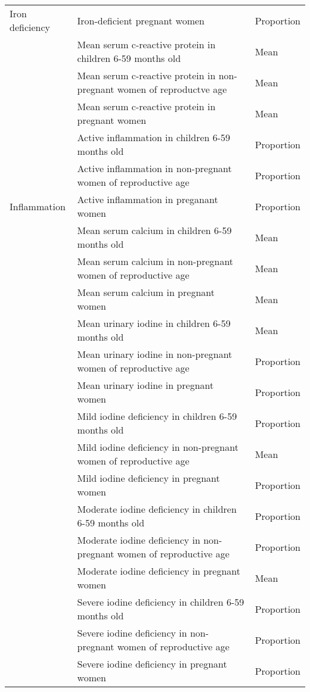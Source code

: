 \documentclass[12pt,a4paper]{article}
\begin{document}
\begin{table}[H]
{\begin{tabular}[t]{lll}
\cmidrule{2-3}
\multirow[t]{-6}{*}{\raggedright\arraybackslash Iron deficiency} & Iron-deficient pregnant women & Proportion\\
\cmidrule{1-3}
\rowcolor{gray!6}   & Mean serum c-reactive protein in children 6-59 months old & Mean\\
\cmidrule{2-3}
 & Mean serum c-reactive protein in non-pregnant women of reproductve age & Mean\\
\cmidrule{2-3}
\rowcolor{gray!6}   & Mean serum c-reactive protein in pregnant women & Mean\\
\cmidrule{2-3}
 & Active inflammation in children 6-59 months old & Proportion\\
\cmidrule{2-3}
\rowcolor{gray!6}   & Active inflammation in non-pregnant women of reproductive age & Proportion\\
\cmidrule{2-3}
\multirow[t]{-6}{*}{\raggedright\arraybackslash Inflammation} & Active inflammation in preganant women & Proportion\\
\cmidrule{1-3}
\rowcolor{gray!6}   & Mean serum calcium in children 6-59 months old & Mean\\
\cmidrule{2-3}
 & Mean serum calcium in non-pregnant women of reproductive age & Mean\\
\cmidrule{2-3}
\rowcolor{gray!6}  \multirow[t]{-3}{*}{\raggedright\arraybackslash Iodine deficiency} & Mean serum calcium in pregnant women & Mean\\
\cmidrule{1-3}
 & Mean urinary iodine in children 6-59 months old & Mean\\
\cmidrule{2-3}
\rowcolor{gray!6}   & Mean urinary iodine in non-pregnant women of reproductive age & Proportion\\
\cmidrule{2-3}
 & Mean urinary iodine in pregnant women & Proportion\\
\cmidrule{2-3}
\rowcolor{gray!6}   & Mild iodine deficiency in children 6-59 months old & Proportion\\
\cmidrule{2-3}
 & Mild iodine deficiency in non-pregnant women of reproductive age & Mean\\
\cmidrule{2-3}
\rowcolor{gray!6}   & Mild iodine deficiency in pregnant women & Proportion\\
\cmidrule{2-3}
 & Moderate iodine deficiency in children 6-59 months old & Proportion\\
\cmidrule{2-3}
\rowcolor{gray!6}   & Moderate iodine deficiency in non-pregnant women of reproductive age & Proportion\\
\cmidrule{2-3}
 & Moderate iodine deficiency in pregnant women & Mean\\
\cmidrule{2-3}
\rowcolor{gray!6}   & Severe iodine deficiency in children 6-59 months old & Proportion\\
\cmidrule{2-3}
 & Severe iodine deficiency in non-pregnant women of reproductive age & Proportion\\
\cmidrule{2-3}
\rowcolor{gray!6}  \multirow[t]{-12}{*}{\raggedright\arraybackslash Calcium levels} & Severe iodine deficiency in pregnant women & Proportion\\
\bottomrule
\end{tabular}}
\end{table}

\newpage

\renewcommand\refname{References}

\end{document}
